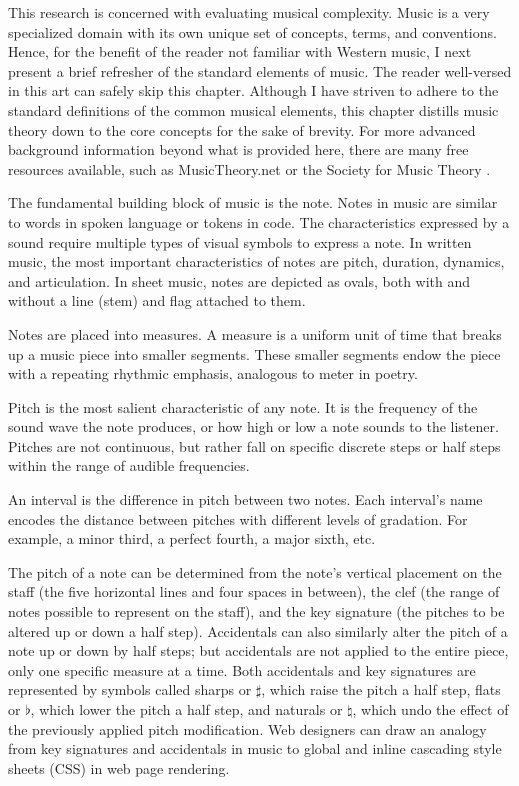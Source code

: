 \documentclass[12pt]{report}
\begin{document}
This research is concerned with evaluating musical complexity. Music is a very specialized domain with its own unique set of concepts, terms, and conventions. Hence, for the benefit of the reader not familiar with Western music, I next present a brief refresher of the standard elements of music. The reader well-versed in this art can safely skip this chapter. Although I have striven to adhere to the standard definitions of the common musical elements, this chapter distills music theory down to the core concepts for the sake of brevity. For more advanced background information beyond what is provided here, there are many free resources available, such as MusicTheory.net \cite{MusicTheoryNet} or the Society for Music Theory \cite{SMT}.

The fundamental building block of music is the note. Notes in music are similar to words in spoken language or tokens in code. The characteristics expressed by a sound require multiple types of visual symbols to express a note. In written music, the most important characteristics of notes are pitch, duration, dynamics, and articulation. In sheet music, notes are depicted as ovals, both with and without a line (stem) and flag attached to them.

Notes are placed into measures. A measure is a uniform unit of time that breaks up a music piece into smaller segments. These smaller segments endow the piece with a repeating rhythmic emphasis, analogous to meter in poetry.

Pitch is the most salient characteristic of any note. It is the frequency of the sound wave the note produces, or how high or low a note sounds to the listener. Pitches are not continuous, but rather fall on specific discrete steps or half steps within the range of audible frequencies. 

An interval is the difference in pitch between two notes. Each interval's name encodes the distance between pitches with different levels of gradation. For example, a minor third, a perfect fourth, a major sixth, etc.

The pitch of a note can be determined from the note's vertical placement on the staff (the five horizontal lines and four spaces in between), the clef (the range of notes possible to represent on the staff), and the key signature (the pitches to be altered up or down a half step). Accidentals can also similarly alter the pitch of a note up or down by half steps; but accidentals are not applied to the entire piece, only one specific measure at a time. Both accidentals and key signatures are represented by symbols called sharps or $\sharp$, which raise the pitch a half step, flats or $\flat$, which lower the pitch a half step, and naturals or $\natural$, which undo the effect of the previously applied pitch modification. Web designers can draw an analogy from key signatures and accidentals in music to global and inline cascading style sheets (CSS) \cite{css} in web page rendering.
\end{document}
